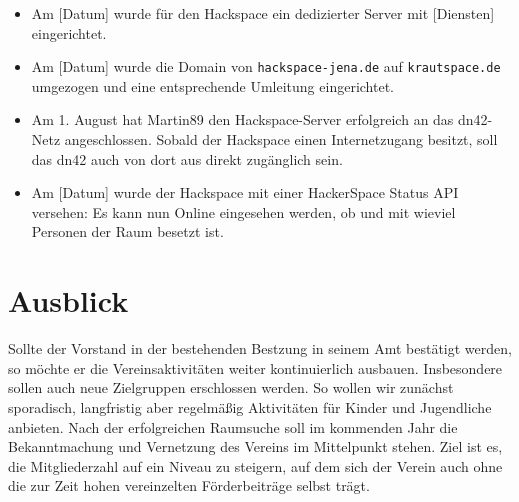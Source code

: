 \documentclass[10pt,DIV16]{scrartcl}
\begin{document}
\begin{itemize}
	\item
		Am [Datum] wurde für den Hackspace ein dedizierter Server mit
		[Diensten] eingerichtet.
	\item
		Am [Datum] wurde die Domain von \texttt{hackspace-jena.de} auf
		\texttt{krautspace.de} umgezogen und eine entsprechende Umleitung
		eingerichtet.
	\item
		Am 1. August hat Martin89 den Hackspace-Server erfolgreich an das
		dn42-Netz angeschlossen.  Sobald der Hackspace einen Internetzugang
		besitzt, soll das dn42 auch von dort aus direkt zugänglich sein.
	\item
		Am [Datum] wurde der Hackspace mit einer HackerSpace Status API
		versehen:  Es kann nun Online eingesehen werden, ob und mit wieviel
		Personen der Raum besetzt ist.
\end{itemize}

\section{Ausblick}

Sollte der Vorstand in der bestehenden Bestzung in seinem Amt bestätigt
werden, so möchte er die Vereinsaktivitäten weiter kontinuierlich ausbauen.
Insbesondere sollen auch neue Zielgruppen erschlossen werden.  So wollen wir
zunächst sporadisch, langfristig aber regelmäßig Aktivitäten für Kinder und
Jugendliche anbieten.  Nach der erfolgreichen Raumsuche soll im kommenden Jahr
die Bekanntmachung und Vernetzung des Vereins im Mittelpunkt stehen.  Ziel ist
es, die Mitgliederzahl auf ein Niveau zu steigern, auf dem sich der Verein
auch ohne die zur Zeit hohen vereinzelten Förderbeiträge selbst trägt.
\end{document}
